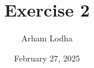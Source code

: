 \documentclass{article}
\begin{document}
\title{Exercise 2}
\author{Arham Lodha}%
\date{February 27, 2025}%
\maketitle

\begin{PROB}{}\label{Problem .}
    
\end{PROB}
\end{document}
